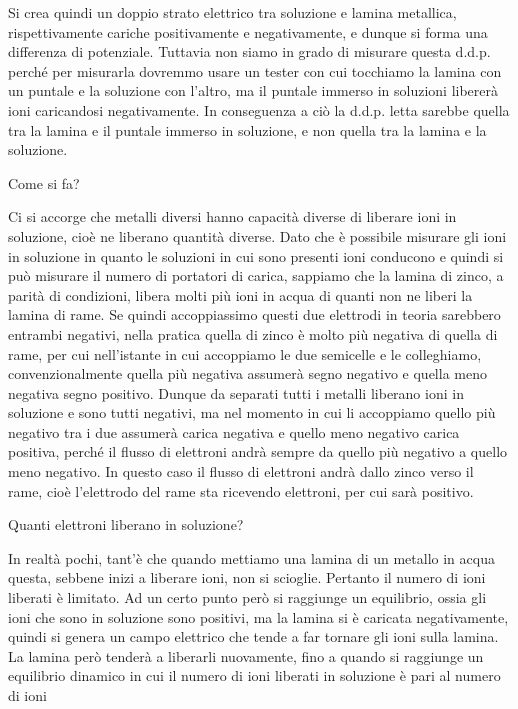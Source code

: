 Si crea quindi un doppio strato elettrico tra soluzione e lamina metallica, rispettivamente cariche positivamente e negativamente, e dunque si forma una differenza di potenziale. Tuttavia non siamo in grado di misurare questa d.d.p. perché per misurarla dovremmo usare un tester con cui tocchiamo la lamina con un puntale e la soluzione con l'altro, ma il puntale immerso in soluzioni libererà ioni caricandosi negativamente. In conseguenza a ciò la d.d.p. letta sarebbe quella tra la lamina e il puntale immerso in soluzione, e non quella tra la lamina e la soluzione.

Come si fa?

Ci si accorge che metalli diversi hanno capacità diverse di liberare ioni in soluzione, cioè ne liberano quantità diverse. Dato che è possibile misurare gli ioni in soluzione in quanto le soluzioni in cui sono presenti ioni conducono e quindi si può misurare il numero di portatori di carica, sappiamo che la lamina di zinco, a parità di condizioni, libera molti più ioni in acqua di quanti non ne liberi la lamina di rame. Se quindi accoppiassimo questi due elettrodi in teoria sarebbero entrambi negativi, nella pratica quella di zinco è molto più negativa di quella di rame, per cui nell'istante in cui accoppiamo le due semicelle e le colleghiamo, convenzionalmente quella più negativa assumerà segno negativo e quella meno negativa segno positivo. Dunque da separati tutti i metalli liberano ioni in soluzione e sono tutti negativi, ma nel momento in cui li accoppiamo quello più negativo tra i due assumerà carica negativa e quello meno negativo carica positiva, perché il flusso di elettroni andrà sempre da quello più negativo a quello meno negativo. In questo caso il flusso di elettroni andrà dallo zinco verso il rame, cioè l'elettrodo del rame sta ricevendo elettroni, per cui sarà positivo.

Quanti elettroni liberano in soluzione?

In realtà pochi, tant'è che quando mettiamo una lamina di un metallo in acqua questa, sebbene inizi a liberare ioni, non si scioglie. Pertanto il numero di ioni liberati è limitato. Ad un certo punto però si raggiunge un equilibrio, ossia gli ioni che sono in soluzione sono positivi, ma la lamina si è caricata negativamente, quindi si genera un campo elettrico che tende a far tornare gli ioni sulla lamina. La lamina però tenderà a liberarli nuovamente, fino a quando si raggiunge un equilibrio dinamico in cui il numero di ioni liberati in soluzione è pari al numero di ioni 

